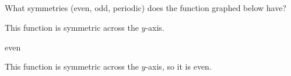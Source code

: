%
%
\subsection*{\Conceptual}


\begin{Mquestion}
What symmetries (even, odd, periodic) does the function graphed below have?
\begin{center}\end{center}
\end{Mquestion}
\begin{hint}
This function is symmetric across the $y$-axis.
\end{hint}
\begin{answer}
even
\end{answer}
\begin{solution}
This function is symmetric across the $y$-axis, so it is even.
\end{solution}


